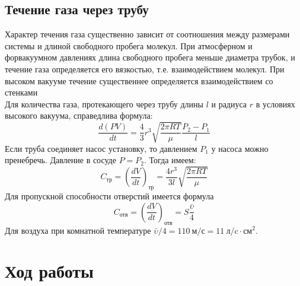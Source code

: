\documentclass[12pt,a4paper]{article}
\begin{document}
\subsection*{Течение газа через трубу}
Характер течения газа существенно зависит от соотношения между размерами системы и длиной свободного пробега молекул. При атмосферном и форвакуумном давлениях  длина свободного пробега меньше диаметра трубок, и течение газа определяется его вязкостью, т.е. взаимодействием молекул. При высоком вакууме течение существеннее определяется взаимодействием со стенками \\
Для количества газа, протекающего через трубу длины $l$ и радиуса $r$ в условиях высокого вакуума, справедлива формула:
\begin{equation}
    \frac{d(PV)}{dt} = \frac{4}{3}r^3\sqrt{\frac{2\pi RT}{\mu}}\frac{P_2 - P_1}{l}
\end{equation}
Если труба соединяет насос установку, то давлением $P_1$ у насоса можно пренебречь. Давление в сосуде $P = P_2$. Тогда имеем:
\begin{equation}
C_\text{тр} = \left(\frac{dV}{dt}\right)_\text{тр} = \frac{4r^3}{3l}\sqrt{\frac{2\pi RT}{\mu}}
\end{equation}
Для пропускной способности отверстий имеется формула
\begin{equation}
C_\text{отв} = \left(\frac{dV}{dt}\right)_\text{отв} = S\frac{\bar{\upsilon}}{4}
\end{equation}
Для воздуха при комнатной температуре $\bar{\upsilon}/4 = 110~\text{м/с} = 11~\text{л/c}\cdot\text{см}^2$.

\newpage

\section{Ход работы}
\end{document}
